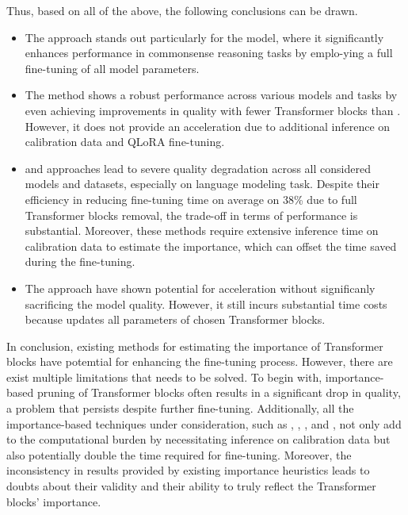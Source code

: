 Thus, based on all of the above, the following conclusions can be drawn.
\begin{itemize}
    \item The \lisa{} approach stands out particularly for the \gpt{} model, where it significantly enhances performance in commonsense reasoning tasks by emplo-ying a full fine-tuning of all model parameters. 
    \item The \uidl{} method shows a robust performance across various models and tasks by even achieving improvements in quality with fewer Transformer blocks than \lora{}. However, it does not provide an acceleration due to additional inference on calibration data and QLoRA fine-tuning. 
    \item \sleb{} and \shortllama{} approaches lead to severe quality degradation across all considered models and datasets, especially on language modeling task. Despite their efficiency in reducing fine-tuning time on average on 38\% due to full Transformer blocks removal, the trade-off in terms of performance is substantial. Moreover, these methods require extensive inference time on calibration data to estimate the importance, which can offset the time saved during the fine-tuning. 
    \item The \ows{} approach have shown potential for acceleration without significanly sacrificing the model quality. However, it still incurs substantial time costs because updates all parameters of chosen Transformer blocks.
\end{itemize}

In conclusion, existing methods for estimating the importance of Transformer blocks have potemtial for enhancing the fine-tuning process. However, there are exist multiple limitations that needs to be solved. To begin with, importance-based pruning of Transformer blocks often results in a significant drop in quality, a problem that persists despite further fine-tuning. Additionally, all the importance-based techniques under consideration, such as \uidl{}, \ows{}, \sleb{}, and \shortllama{}, not only add to the computational burden by necessitating inference on calibration data but also potentially double the time required for fine-tuning. Moreover, the inconsistency in results provided by existing importance heuristics leads to doubts about their validity and their ability to truly reflect the Transformer blocks' importance.


